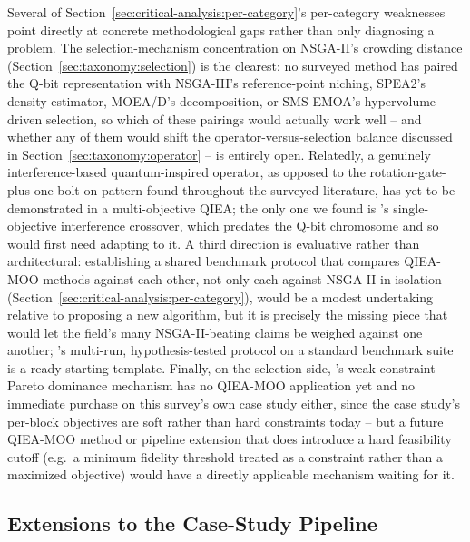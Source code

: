 Several of Section~\ref{sec:critical-analysis:per-category}'s
per-category weaknesses point directly at concrete methodological gaps
rather than only diagnosing a problem. The selection-mechanism
concentration on NSGA-II's crowding distance
(Section~\ref{sec:taxonomy:selection}) is the clearest: no surveyed
method has paired the Q-bit representation with NSGA-III's
reference-point niching, SPEA2's density estimator, MOEA/D's
decomposition, or SMS-EMOA's hypervolume-driven selection, so which of
these pairings would actually work well -- and whether any of them
would shift the operator-versus-selection balance discussed in
Section~\ref{sec:taxonomy:operator} -- is entirely open. Relatedly, a
genuinely interference-based quantum-inspired operator, as opposed to
the rotation-gate-plus-one-bolt-on pattern found throughout the
surveyed literature, has yet to be demonstrated in a multi-objective
QIEA; the only one we found is \citet{narayanan1996qiga}'s
single-objective interference crossover, which predates the Q-bit
chromosome and so would first need adapting to it. A third
direction is evaluative rather than architectural: establishing a
shared benchmark protocol that compares QIEA-MOO methods against each
other, not only each against NSGA-II in isolation
(Section~\ref{sec:critical-analysis:per-category}), would be a modest
undertaking relative to proposing a new algorithm, but it is precisely
the missing piece that would let the field's many NSGA-II-beating
claims be weighed against one another; \citet{olvera2023continuous}'s
multi-run, hypothesis-tested protocol on a standard benchmark suite is
a ready starting template. Finally, on the selection side,
\citet{guo2025weakconstraintpareto}'s weak constraint-Pareto
dominance mechanism has no QIEA-MOO application yet and no immediate
purchase on this survey's own case study either, since the case
study's per-block objectives are soft rather than hard constraints today -- but a future QIEA-MOO
method or pipeline extension that does introduce a hard feasibility
cutoff (e.g.\ a minimum fidelity threshold treated as a constraint
rather than a maximized objective) would have a directly applicable
mechanism waiting for it.

\subsection{Extensions to the Case-Study Pipeline}
\label{sec:open-challenges:pipeline}

